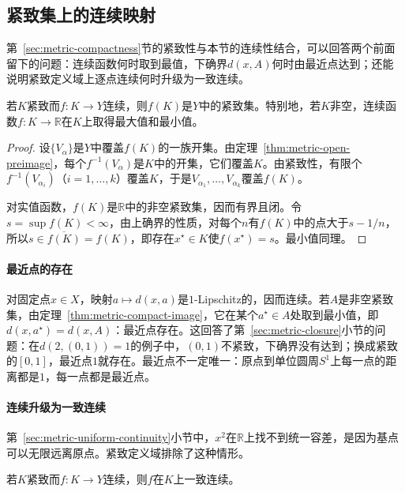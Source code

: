 \subsection{紧致集上的连续映射}
\label{sec:metric-compact-continuous}

第~\ref{sec:metric-compactness}节的紧致性与本节的连续性结合，可以回答两个前面留下的问题：连续函数何时取到最值，下确界$d(x,A)$何时由最近点达到；还能说明紧致定义域上逐点连续何时升级为一致连续。

\begin{theorem}[连续像保持紧致]
\label{thm:metric-compact-image}
若$K$紧致而$f:K\to Y$连续，则$f(K)$是$Y$中的紧致集。特别地，若$K$非空，连续函数$f:K\to\mathbb R$在$K$上取得最大值和最小值。
\end{theorem}

\begin{proof}
设$\{V_\alpha\}$是$Y$中覆盖$f(K)$的一族开集。由定理~\ref{thm:metric-open-preimage}，每个$f^{-1}(V_\alpha)$是$K$中的开集，它们覆盖$K$。由紧致性，有限个$f^{-1}(V_{\alpha_i})$（$i=1,\dots,k$）覆盖$K$，于是$V_{\alpha_1},\dots,V_{\alpha_k}$覆盖$f(K)$。

对实值函数，$f(K)$是$\mathbb R$中的非空紧致集，因而有界且闭。令$s=\sup f(K)<\infty$，由上确界的性质，对每个$n$有$f(K)$中的点大于$s-1/n$，所以$s\in\overline{f(K)}=f(K)$，即存在$x^\star\in K$使$f(x^\star)=s$。最小值同理。
\end{proof}

\paragraph{最近点的存在}
对固定点$x\in X$，映射$a\mapsto d(x,a)$是$1$-Lipschitz的，因而连续。若$A$是非空紧致集，由定理~\ref{thm:metric-compact-image}，它在某个$a^\star\in A$处取到最小值，即$d(x,a^\star)=d(x,A)$：最近点存在。这回答了第~\ref{sec:metric-closure}小节的问题：在$d(2,(0,1))=1$的例子中，$(0,1)$不紧致，下确界没有达到；换成紧致的$[0,1]$，最近点$1$就存在。最近点不一定唯一：原点到单位圆周$S^1$上每一点的距离都是$1$，每一点都是最近点。

\paragraph{连续升级为一致连续}
第~\ref{sec:metric-uniform-continuity}小节中，$x^2$在$\mathbb R$上找不到统一容差，是因为基点可以无限远离原点。紧致定义域排除了这种情形。

\begin{theorem}[紧致集上的一致连续]
\label{thm:metric-compact-uniform}
若$K$紧致而$f:K\to Y$连续，则$f$在$K$上一致连续。
\end{theorem}

